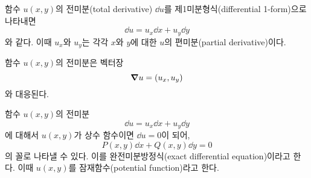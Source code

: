 \documentclass[../engineering_mathematics_lecture_note.tex]{subfiles}
\begin{document}
\begin{definition}
    함수 $u(x, y)$의 전미분(total derivative) $\dd{u}$를 제1미분형식(differential 1-form)으로 나타내면
    \begin{equation*}
        \dd{u} = u_x \dd{x} + u_y \dd{y}
    \end{equation*}
    와 같다.
    이때 $u_x$와 $u_y$는 각각 $x$와 $y$에 대한 $u$의 편미분(partial derivative)이다.
\end{definition}

\begin{remark}
    함수 $u(x, y)$의 전미분은 벡터장
    \begin{equation*}
        \grad u = (u_x, u_y)
    \end{equation*}
    와 대응된다.
\end{remark}

\begin{definition}
    함수 $u(x, y)$의 전미분
    \begin{equation*}
        \dd{u} = u_x \dd{x} + u_y \dd{y}
    \end{equation*}
    에 대해서 $u(x, y)$가 상수 함수이면 $\dd{u} = 0$이 되어,
    \begin{equation*}
        P(x, y) \dd{x} + Q(x, y) \dd{y} = 0
    \end{equation*}
    의 꼴로 나타낼 수 있다.
    이를 완전미분방정식(exact differential equation)이라고 한다.
    이때 $u(x, y)$를 잠재함수(potential function)라고 한다.
\end{definition}
\end{document}
